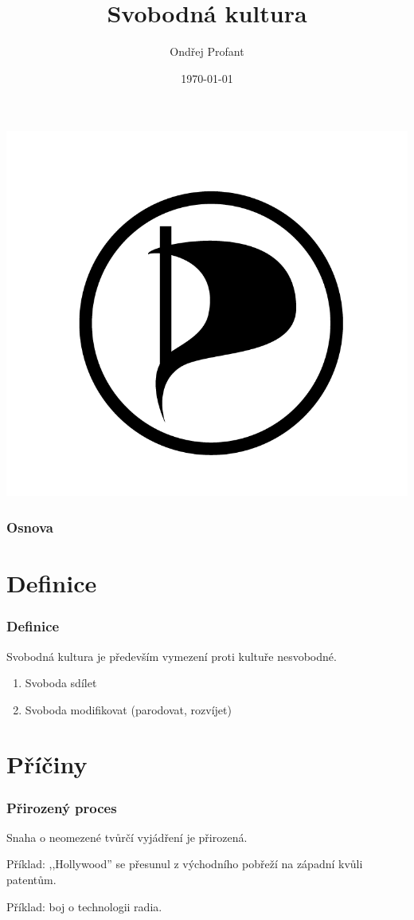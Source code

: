 \documentclass[xetex]{beamer}
\title{Svobodná kultura}
\author{Ondřej Profant}
\institute[Piráti]{Pirátská strana}
\date{\today}
\begin{document}
\begin{frame}
  \titlepage
  \includegraphics[scale=0.4]{plachta_s_okrajem.png}
\end{frame}

\begin{frame}
  \frametitle{Osnova}
  \tableofcontents
\end{frame}

\section{Definice}

\begin{frame}
	\frametitle{Definice}
	Svobodná kultura je především vymezení proti kultuře nesvobodné.
	
	\begin{enumerate}
		\item Svoboda sdílet
		\item Svoboda modifikovat (parodovat, rozvíjet)
	\end{enumerate}
\end{frame}

\section{Příčiny}
\begin{frame}
	\frametitle{Přirozený proces}
	Snaha o neomezené tvůrčí vyjádření je přirozená.
	
	\bigskip
	
	Příklad: ,,Hollywood'' se přesunul z východního pobřeží na západní kvůli patentům.
	
	\bigskip
	
	Příklad: boj o technologii radia.
\end{frame}
\end{document}
